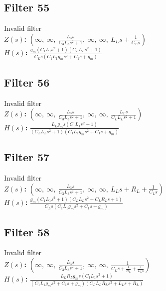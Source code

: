 \documentclass{article}
\begin{document}
\subsection*{Filter 55}
Invalid filter \\ 
\textbf{$Z(s)$:} $\left( \infty, \  \infty, \  \frac{L_{3} s}{C_{3} L_{3} s^{2} + 1}, \  \infty, \  \infty, \  L_{L} s + \frac{1}{C_{L} s}\right)$ \\ 
\textbf{$H(s)$:} $\frac{g_{m} \left(C_{1} L_{1} s^{2} + 1\right) \left(C_{L} L_{L} s^{2} + 1\right)}{C_{L} s \left(C_{1} L_{1} g_{m} s^{2} + C_{1} s + g_{m}\right)}$ \\ 
\subsection*{Filter 56}
Invalid filter \\ 
\textbf{$Z(s)$:} $\left( \infty, \  \infty, \  \frac{L_{3} s}{C_{3} L_{3} s^{2} + 1}, \  \infty, \  \infty, \  \frac{L_{L} s}{C_{L} L_{L} s^{2} + 1}\right)$ \\ 
\textbf{$H(s)$:} $\frac{L_{L} g_{m} s \left(C_{1} L_{1} s^{2} + 1\right)}{\left(C_{L} L_{L} s^{2} + 1\right) \left(C_{1} L_{1} g_{m} s^{2} + C_{1} s + g_{m}\right)}$ \\ 
\subsection*{Filter 57}
Invalid filter \\ 
\textbf{$Z(s)$:} $\left( \infty, \  \infty, \  \frac{L_{3} s}{C_{3} L_{3} s^{2} + 1}, \  \infty, \  \infty, \  L_{L} s + R_{L} + \frac{1}{C_{L} s}\right)$ \\ 
\textbf{$H(s)$:} $\frac{g_{m} \left(C_{1} L_{1} s^{2} + 1\right) \left(C_{L} L_{L} s^{2} + C_{L} R_{L} s + 1\right)}{C_{L} s \left(C_{1} L_{1} g_{m} s^{2} + C_{1} s + g_{m}\right)}$ \\ 
\subsection*{Filter 58}
Invalid filter \\ 
\textbf{$Z(s)$:} $\left( \infty, \  \infty, \  \frac{L_{3} s}{C_{3} L_{3} s^{2} + 1}, \  \infty, \  \infty, \  \frac{1}{C_{L} s + \frac{1}{R_{L}} + \frac{1}{L_{L} s}}\right)$ \\ 
\textbf{$H(s)$:} $\frac{L_{L} R_{L} g_{m} s \left(C_{1} L_{1} s^{2} + 1\right)}{\left(C_{1} L_{1} g_{m} s^{2} + C_{1} s + g_{m}\right) \left(C_{L} L_{L} R_{L} s^{2} + L_{L} s + R_{L}\right)}$ \\ 
\end{document}
